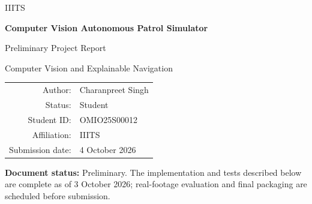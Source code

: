 \documentclass[conference,10pt]{IEEEtran}
\begin{document}
\begin{titlepage}
\thispagestyle{empty}
\begin{center}
\vspace*{1.0in}
{\large IIITS\par}
\vspace{0.65in}
{\Huge\bfseries Computer Vision Autonomous Patrol Simulator\par}
\vspace{0.26in}
{\LARGE Preliminary Project Report\par}
\vspace{0.42in}
{\large Computer Vision and Explainable Navigation\par}
\vfill
\begin{tabular}{rl}
Author: & Charanpreet Singh\\[0.12in]
Status: & Student\\[0.12in]
Student ID: & OMIO25S00012\\[0.12in]
Affiliation: & IIITS\\[0.12in]
Submission date: & 4 October 2026\\
\end{tabular}
\vspace{0.65in}
\end{center}
\noindent\textbf{Document status:} Preliminary. The implementation and tests described below are complete as of 3 October 2026; real-footage evaluation and final packaging are scheduled before submission.
\end{titlepage}
\end{document}
